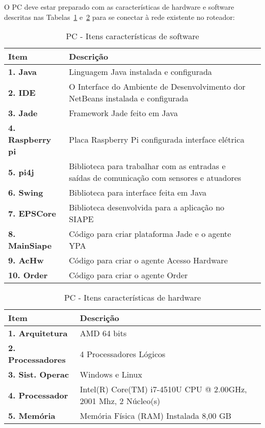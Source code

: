 	
	O PC deve estar preparado com as características de hardware e software descritas nas Tabelas~\ref{T2} e~\ref{T3} para se conectar à rede existente no roteador:
	
	\begin{table}
		\centering
		\caption{PC - Itens características de software}
		\begin{tabular}{|p{4cm}| p{11cm}| c| } \hline
			\textbf{ Item }	   & \textbf{ Descrição}	 \\ \hline
			\textbf{1. Java}   & Linguagem Java instalada e configurada \\ \hline
			\textbf{2. IDE}    & O Interface do Ambiente de 
			Desenvolvimento dor NetBeans instalada e configurada \\ \hline
			\textbf{3. Jade}		  & Framework Jade feito em Java\\ \hline
			\textbf{4. Raspberry pi}	 & Placa Raspberry Pi configurada interface  elétrica\\ \hline
			\textbf{5. pi4j}	 & Biblioteca para trabalhar com as entradas
			 e saídas de comunicação com sensores e atuadores\\ \hline
			\textbf{6. Swing}	 & Biblioteca para interface feita em Java\\ \hline
			\textbf{7. EPSCore}	 & Biblioteca desenvolvida para a aplicação no SIAPE\\ \hline
			\textbf{8. MainSiape}	 & Código para criar plataforma Jade e o agente YPA\\ \hline
			\textbf{9. AcHw}	 & Código para criar o agente Acesso Hardware\\ \hline
			\textbf{10. Order}	 & Código para criar o agente Order\\ \hline
		\end{tabular}
		\label{T2}
	\end{table}
	
	\begin{table}
		\centering
		\caption{PC - Itens características de hardware}
		\begin{tabular}{|p{4cm}| p{11cm}| l|} \hline
			\textbf{ Item }	   & \textbf{ Descrição}	 \\ \hline
			\textbf{1. Arquitetura }   & AMD 64 bits \\ \hline
			\textbf{2. Processadores}       & 4 Processadores Lógicos \\ \hline
			\textbf{3. Sist. Operac}	& Windows e Linux\\ \hline
			\textbf{4. Processador}	   &  Intel(R) Core(TM) i7-4510U CPU @ 2.00GHz, 2001 Mhz, 2 Núcleo(s)\\ \hline
			\textbf{5. Memória}	         & Memória Física (RAM) Instalada	8,00 GB\\ \hline
		\end{tabular}
		\label{T3}\par
	\end{table}
	
